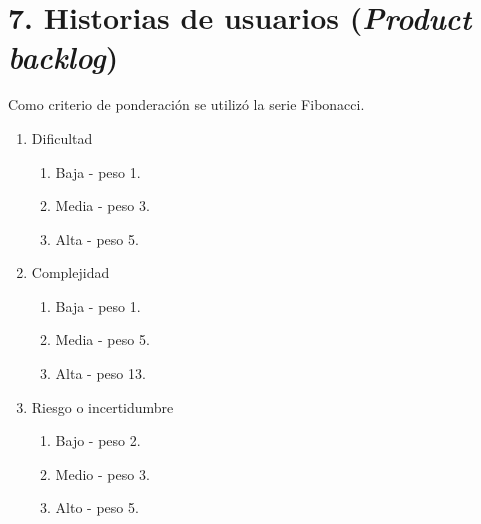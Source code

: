 \documentclass[
11pt, %
]{charter}
\begin{document}
\section{7. Historias de usuarios (\textit{Product backlog})}
\label{sec:backlog}

Como criterio de ponderación se utilizó la serie Fibonacci.

\begin{enumerate}
	\item Dificultad
		\begin{enumerate}
			\item Baja - peso 1.
			\item Media - peso 3.
			\item Alta - peso 5.
		\end{enumerate}
	\item Complejidad
		\begin{enumerate}
			\item Baja - peso 1.
			\item Media - peso 5.
			\item Alta - peso 13.
		\end{enumerate}
	\item Riesgo o incertidumbre
		\begin{enumerate}
			\item Bajo - peso 2.
			\item Medio - peso 3.
			\item Alto - peso 5.
		\end{enumerate}
\end{enumerate}
\end{document}

